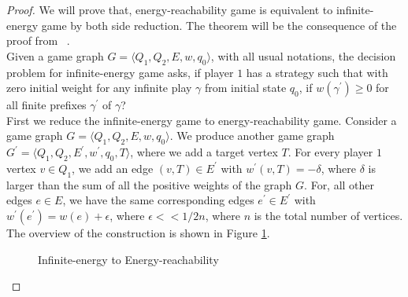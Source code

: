 \begin{proof}
We will prove that, energy-reachability game is equivalent to infinite-energy game by both side reduction. The theorem will be the consequence of the proof from ~\cite{DBLP:conf/formats/BouyerFLMS08}.\\

Given a game graph $G=\langle Q_1, Q_2, E, w, q_0\rangle$, with all usual notations, the decision problem for infinite-energy game asks, if player $1$ has a strategy such that with zero initial weight for any infinite play $\gamma$ from initial state $q_0$, if $w(\gamma^{\prime}) \geq 0$ for all finite prefixes $\gamma^{\prime}$ of $\gamma$? \\
First we reduce the infinite-energy game to energy-reachability game.
Consider a game graph $G=\langle Q_1, Q_2, E, w, q_0\rangle$. We produce another game graph $G^{\prime}=\langle Q_1, Q_2, E^{\prime}, w^{\prime}, q_0,T\rangle$, where we add a target vertex $T$. For every player $1$ vertex $v \in Q_1$, we add an edge $(v,T) \in E^{\prime}$ with $w^{\prime}(v,T) = -\delta$, where $\delta$ is larger than the sum of all the positive weights of the graph $G$. For, all other edges $e \in E$, we have the same corresponding edges $e^{\prime} \in E^{\prime}$ with $w^{\prime}(e^{\prime})= w(e)+ \epsilon$, where $\epsilon << 1/2n$, where $n$ is the total number of vertices. The overview of the construction is shown in Figure \ref{inf-reach}.
\begin{figure}
    \label{inf-reach}
    \centering
    
    \caption{Infinite-energy to Energy-reachability}
\end{figure}


\end{proof}
